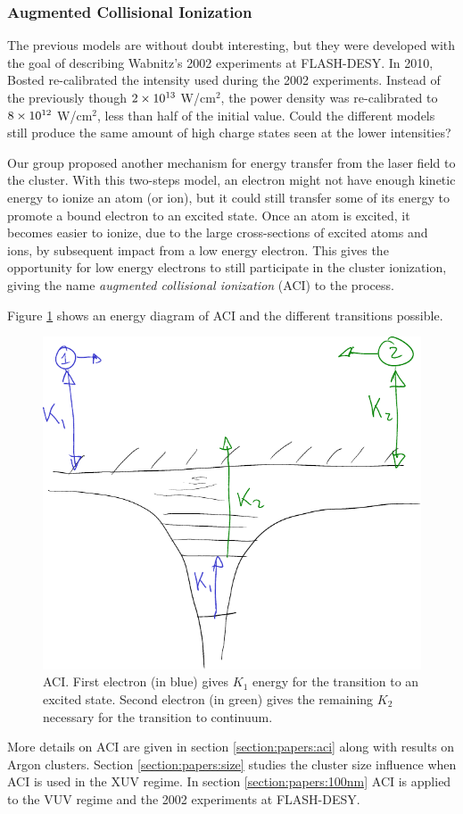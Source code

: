 \subsubsection{Augmented Collisional Ionization}
The previous models are without doubt interesting, but they were developed with
the goal of describing Wabnitz's 2002 experiments at FLASH-DESY. In 2010, Bosted
re-calibrated the intensity used during the 2002 experiments.
Instead of the previously though $\ten{2}{13}$ W/cm$^2$, the power density was
re-calibrated to $\ten{8}{12}$ W/cm$^2$, less than half of the initial value.
Could the different models still produce the same amount of high charge states
seen at the lower intensities?

Our group proposed another mechanism for energy transfer from the laser field
to the cluster. With this two-steps model, an electron might not have enough
kinetic energy to ionize an atom (or ion), but it could still transfer some of
its energy to promote a bound electron to an excited state. Once an atom is
excited, it becomes easier to ionize, due to the large cross-sections of excited
atoms and ions, by subsequent impact from a low energy electron. This gives the
opportunity for low energy electrons to still participate in the cluster
ionization, giving the name \textit{augmented collisional ionization} (ACI) to
the process.

Figure \ref{fig:ionization:aci} shows an energy diagram of ACI and the
different transitions possible.
\begin{figure}
 \centering
 \includegraphics[width=0.38\columnwidth]{figures/mockups/ionization_aci}
 \caption{ACI. First electron (in blue) gives $K_1$ energy for the transition
          to an excited state. Second electron (in green) gives the remaining
          $K_2$ necessary for the transition to continuum.}
 \label{fig:ionization:aci}
\end{figure}

More details on ACI are given in section \ref{section:papers:aci} along with
results on Argon clusters. Section \ref{section:papers:size} studies the cluster
size influence when ACI is used in the XUV regime. In section
\ref{section:papers:100nm} ACI is applied to the VUV regime and the
2002 experiments at FLASH-DESY.




